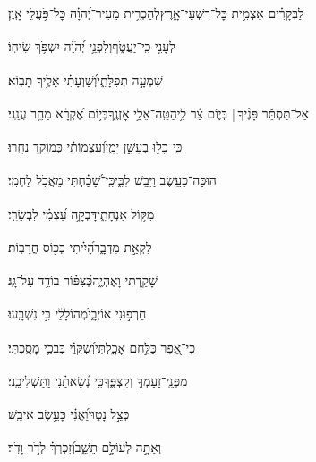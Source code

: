 \documentclass[12pt]{article}
\newcommand{\loc}[1]{\textsuperscript{\locf{#1}}}
\begin{document}
{\loc{ ח}~}‏לַבְּקָרִ֗ים אַצְמִ֥ית כׇּל־רִשְׁעֵי־אָ֑רֶץ{\hfill}לְהַכְרִ֥ית מֵעִיר־יְ֝הֹוָ֗ה כׇּל־פֹּ֥עֲלֵי אָֽוֶן׃\par\pend
\ledpb
\pstart[\subsection*{\textcolor{red}{פרק קב}}]\label{פרק קב}
{\loc{ א}~}‏ לְעָנִ֣י כִֽי־יַעֲטֹ֑ף{\hfill}וְלִפְנֵ֥י יְ֝הֹוָ֗ה יִשְׁפֹּ֥ךְ שִׂיחֽוֹ׃\par

{\loc{ ב}~}‏ שִׁמְעָ֣ה תְפִלָּתִ֑י{\hfill}וְ֝שַׁוְעָתִ֗י אֵלֶ֥יךָ תָבֽוֹא׃\par

{\loc{ ג}~}‏אַל־תַּסְתֵּ֬ר פָּנֶ֨יךָ |  {\hfill}בְּי֢וֹם צַ֫ר לִ֥י\newline\hspace*{.5em}הַטֵּֽה־אֵלַ֥י אׇזְנֶ֑ךָ{\hfill}בְּי֥וֹם אֶ֝קְרָ֗א מַהֵ֥ר עֲנֵֽנִי׃\par

{\loc{ ד}~}‏כִּֽי־כָל֣וּ בְעָשָׁ֣ן יָמָ֑י{\hfill}וְ֝עַצְמוֹתַ֗י כְּמוֹקֵ֥ד נִחָֽרוּ׃\par

{\loc{ ה}~}‏הוּכָּה־כָעֵ֣שֶׂב וַיִּבַ֣שׁ לִבִּ֑י{\hfill}כִּֽי־שָׁ֝כַ֗חְתִּי מֵאֲכֹ֥ל לַחְמִֽי׃\par

{\loc{ ו}~}‏מִקּ֥וֹל אַנְחָתִ֑י{\hfill}דָּבְקָ֥ה עַ֝צְמִ֗י לִבְשָׂרִֽי׃\par

{\loc{ ז}~}‏ לִקְאַ֣ת מִדְבָּ֑ר{\hfill}הָ֝יִ֗יתִי כְּכ֣וֹס חֳרָבֽוֹת׃\par

{\loc{ ח}~}‏שָׁקַ֥דְתִּי וָאֶהְיֶ֑ה{\hfill}כְּ֝צִפּ֗וֹר בּוֹדֵ֥ד עַל־גָּֽג׃\par

{\loc{ ט}~}‏ חֵרְפ֣וּנִי אוֹיְבָ֑י{\hfill}מְ֝הוֹלָלַ֗י בִּ֣י נִשְׁבָּֽעוּ׃\par

{\loc{ י}~}‏כִּי־אֵ֭פֶר כַּלֶּ֣חֶם אָכָ֑לְתִּי{\hfill}וְ֝שִׁקֻּוַ֗י בִּבְכִ֥י מָסָֽכְתִּי׃\par

{\loc{ יא}~}‏מִפְּנֵֽי־זַעַמְךָ֥ וְקִצְפֶּ֑ךָ{\hfill}כִּ֥י נְ֝שָׂאתַ֗נִי וַתַּשְׁלִיכֵֽנִי׃\par

{\loc{ יב}~}‏ כְּצֵ֣ל נָט֑וּי{\hfill}וַ֝אֲנִ֗י כָּעֵ֥שֶׂב אִיבָֽשׁ׃\par

{\loc{ יג}~}‏וְאַתָּ֣ה  לְעוֹלָ֣ם תֵּשֵׁ֑ב{\hfill}וְ֝זִכְרְךָ֗ לְדֹ֣ר וָדֹֽר׃\par
\end{document}
